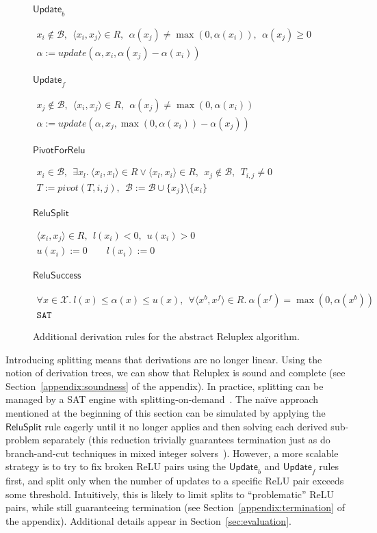 \documentclass[a4paper]{llncs}
\newcommand{\basic}{\mathcal{B}}
\newcommand{\allvars}{\mathcal{X}}
\newcommand{\ub}{u}
\newcommand{\lb}{l}
\newcommand{\reluSet}{R}
\newcommand{\assignment}{\alpha{}}
\newcommand{\sat}{\texttt{SAT}}
\newcommand{\drule}[2]{
\renewcommand{\arraystretch}{1.2}
\(\begin{array}{c}
#1 \\
\hline
#2
\end{array}\)
}
\newcommand{\rulename}[1]{\ensuremath{\mathsf{#1}}\xspace}
\newcommand{\irulename}[2]{\ensuremath{\mathsf{#1}_{#2}}\xspace}
\newcommand{\updateb}{\irulename{Update}{b}}
\newcommand{\updatef}{\irulename{Update}{f}}
\newcommand{\reluSuccess}{\rulename{ReluSuccess}}
\newcommand{\pivotForRelu}{\rulename{PivotForRelu}}
\newcommand{\reluSplit}{\rulename{ReluSplit}}
\newcommand{\pivotOperation}{\textit{pivot}}
\newcommand{\updateOperation}{\textit{update}}
\begin{document}
\begin{figure}[t]
\begin{centering}
\scriptsize

\updateb
\drule{
x_i\notin\basic, 
\ \
\langle x_i, x_j\rangle \in \reluSet,
\ \ 
\assignment(x_j)\neq \max{}(0,\assignment(x_i)),
\ \ 
 \assignment(x_j)\geq 0
}
{
\assignment := \updateOperation(\assignment, x_i, \assignment(x_j)-\assignment(x_i))
}
\medskip

\updatef
\drule{
x_j\notin\basic, 
\ \
\langle x_i, x_j\rangle \in \reluSet,
\ \ 
\assignment(x_j)\neq \max{}(0,\assignment(x_i))
}
{
\assignment := \updateOperation(\assignment, x_j, \max{}(0, \assignment(x_i)) -\assignment(x_j))
}
\medskip


\pivotForRelu
\drule{
x_i\in\basic,
\ \ 
\exists x_l. \ \langle x_i, x_l\rangle \in \reluSet \vee \langle x_l, x_i\rangle \in \reluSet,
\ \ 
x_j\notin\basic,
\ \ 
T_{i,j} \neq 0
}
{
T:=\pivotOperation{}(T,i,j), 
\ \ 
\basic := \basic\cup \{x_j\} \setminus \{x_i\}
}
\medskip

\reluSplit
\drule{
\langle x_i, x_j\rangle \in \reluSet, 
\ \ 
\lb(x_i)<0,
\ \ 
 \ub(x_i)>0
}
{
\ub(x_i):= 0 
\qquad
\lb(x_i):= 0 
}
\medskip

\reluSuccess
\drule{
\forall x\in\allvars. \ 
\lb(x) \leq \assignment(x) \leq \ub(x), 
\ \ 
\forall \langle x^b,x^f \rangle \in \reluSet. \
\assignment(x^f) = \max{}(0, \assignment(x^b))
}
{
\sat{}
}
\caption{Additional derivation rules for the abstract Reluplex algorithm.}
\label{fig:abstractReluplex}
\end{centering}
\end{figure}


Introducing splitting  means that derivations are
no longer linear.  Using the notion of derivation trees, we
can show that Reluplex is sound and complete (see 
Section~\ref*{appendix:soundness} of the
appendix).
In practice, splitting can be managed by a SAT engine with splitting-on-demand~\cite{BaNiOlTi06}.
The na\"ive approach mentioned at the beginning of this section can be
simulated by applying the \reluSplit{} rule eagerly until it no longer applies
and then solving each derived sub-problem separately (this reduction trivially
guarantees termination just as do branch-and-cut techniques in mixed integer solvers~\cite{PaRi91}).
However, a more scalable
 strategy is to try to fix broken ReLU pairs
using the \updateb{} and \updatef{} rules first, and split
only when the number of updates to a specific ReLU pair
exceeds some threshold. Intuitively, this is likely
to limit splits to ``problematic'' ReLU pairs,
while still guaranteeing termination (see 
Section~\ref*{appendix:termination} of the
appendix).
Additional details appear in Section~\ref{sec:evaluation}.
\end{document}
